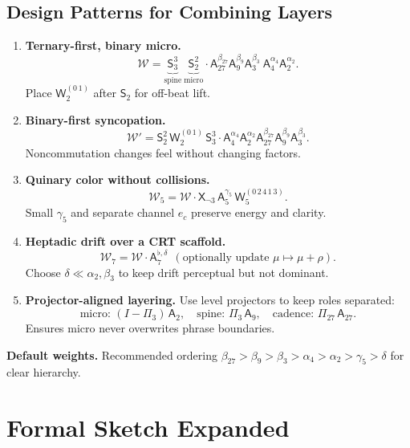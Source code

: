 \documentclass[12pt]{article}
\numberwithin{equation}{section}
\theoremstyle{plain}
\theoremstyle{definition}
\theoremstyle{remark}
\begin{document}
\subsection*{Design Patterns for Combining Layers}
\begin{enumerate}
  \item \textbf{Ternary-first, binary micro.}
  \[
  \mathcal{W}=\underbrace{\mathsf{S}_3^3}_{\text{spine}}\ \underbrace{\mathsf{S}_2^2}_{\text{micro}}\cdot
  \mathsf{A}_{27}^{\beta_{27}}\mathsf{A}_{9}^{\beta_9}\mathsf{A}_{3}^{\beta_3}\ \mathsf{A}_{4}^{\alpha_4}\mathsf{A}_{2}^{\alpha_2}.
  \]
  Place $\mathsf{W}_2^{(0\,1)}$ after $\mathsf{S}_2$ for off-beat lift.

  \item \textbf{Binary-first syncopation.}
  \[
  \mathcal{W}'=\mathsf{S}_2^2\,\mathsf{W}_2^{(0\,1)}\,\mathsf{S}_3^3\cdot
  \mathsf{A}_{4}^{\alpha_4}\mathsf{A}_{2}^{\alpha_2}\mathsf{A}_{27}^{\beta_{27}}\mathsf{A}_{9}^{\beta_9}\mathsf{A}_{3}^{\beta_3}.
  \]
  Noncommutation changes feel without changing factors.

  \item \textbf{Quinary color without collisions.}
  \[
  \mathcal{W}_{5}=\mathcal{W}\cdot \mathsf{X}_{\neg 3}\,\mathsf{A}_5^{\gamma_5}\,\mathsf{W}_5^{(0\,2\,4\,1\,3)}.
  \]
  Small $\gamma_5$ and separate channel $e_c$ preserve energy and clarity.

  \item \textbf{Heptadic drift over a CRT scaffold.}
  \[
  \mathcal{W}_{7}=\mathcal{W}\cdot \mathsf{A}_7^{\flat,\delta}\ \ (\text{optionally update }\mu\mapsto \mu+\rho).
  \]
  Choose $\delta\ll \alpha_2,\beta_3$ to keep drift perceptual but not dominant.

  \item \textbf{Projector-aligned layering.}
  Use level projectors to keep roles separated:
  \[
  \text{micro: } (I-\Pi_{3})\,\mathsf{A}_{2},\quad
  \text{spine: } \Pi_{3}\,\mathsf{A}_{9},\quad
  \text{cadence: } \Pi_{27}\,\mathsf{A}_{27}.
  \]
  Ensures micro never overwrites phrase boundaries.
\end{enumerate}

\noindent\textbf{Default weights.} Recommended ordering $\beta_{27}>\beta_{9}>\beta_{3}>\alpha_{4}>\alpha_{2}>\gamma_{5}>\delta$ for clear hierarchy.

\section*{Formal Sketch Expanded}
\end{document}
